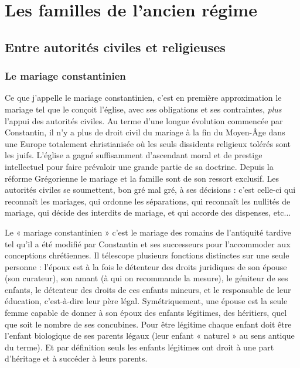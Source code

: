 
\part[Les familles de l'ancien régime]{Les familles de l'ancien régime}

\chapter[Entre autorités civiles et religieuses]{Entre autorités civiles et religieuses}



\section{Le mariage constantinien}

Ce que j'appelle le mariage constantinien, c'est en première approximation le mariage tel que le conçoit l'église, avec ses obligations et ses contraintes, \emph{plus}  l'appui des autorités civiles. Au terme d'une longue évolution commencée par Constantin, il n'y a plus de droit civil du mariage à la fin du Moyen-Âge dans une Europe totalement christianisée où les seuls dissidents religieux tolérés sont les juifs. L'église a gagné suffisamment d'ascendant moral et de prestige intellectuel pour faire prévaloir une grande partie de sa doctrine. Depuis la réforme Grégorienne le mariage et la famille sont de son ressort exclusif. Les autorités civiles se soumettent, bon gré mal gré, à ses décisions : c'est celle-ci qui reconnaît les mariages, qui ordonne les séparations, qui reconnaît les nullités de mariage, qui décide des interdits de mariage, et qui accorde des dispenses, etc...

Le « mariage constantinien » c'est le mariage des romains de l'antiquité tardive tel qu'il a été modifié par Constantin et ses successeurs pour l'accommoder aux conceptions chrétiennes. Il télescope plusieurs fonctions distinctes sur une seule personne : l'époux est à la fois le détenteur des droits juridiques de son épouse (son curateur), son amant (à qui on recommande la mesure), le géniteur de ses enfants, le détenteur des droits de ces enfants mineurs, et le responsable de leur éducation, c'est-à-dire leur père légal. Symétriquement, une épouse est la seule femme capable de donner à son époux des enfants légitimes, des héritiers, quel que soit le nombre de ses concubines. Pour être légitime chaque enfant doit être l'enfant biologique de ses parents légaux (leur enfant « naturel » au sens antique du terme). Et par définition seuls les enfants légitimes ont droit à une part d'héritage et à succéder à leurs parents.



